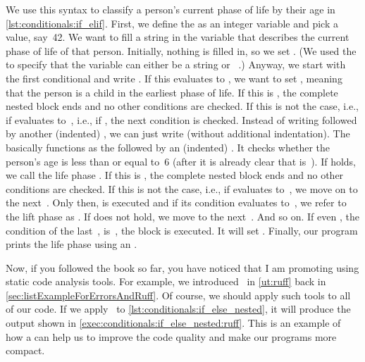 We use this syntax to classify a person's current phase of life by their age in \cref{lst:conditionals:if_elif}.
First, we define the  as an integer variable and pick a value, say~42.
We want to fill a string in the variable  that describes the current phase of life of that person.
Initially, nothing is filled in, so we set .
(We used the   to specify that the variable can either be a string or ~\cite{PEP604}.)
Anyway, we start with the first conditional and write .
If this evaluates to , we want to set , meaning that the person is a child in the earliest phase of life.
If this is , the complete nested  block ends and no other conditions are checked.
If this is not the case, i.e., if  evaluates to~, i.e., if , the next condition is checked.
Instead of writing  followed by another (indented) , we can just write  (without additional indentation).
The  basically functions as the  followed by an (indented) .
It checks whether the person's age is less than or equal to~6 (after it is already clear that  is~).
If  holds, we call the life phase .
If this is , the complete nested  block ends and no other conditions are checked.
If this is not the case, i.e., if  evaluates to~, we move on to the next~.
Only then,  is executed and if its condition evaluates to~, we refer to the lift phase as .
If  does not hold, we move to the next~.
And so on.
If even , the condition of the last~, is~, the  block is executed.
It will set .
Finally, our program prints the life phase using an .

Now, if you followed the book so far, you have noticed that I am promoting using static code analysis tools.
For example, we introduced \ruff\ in \cref{ut:ruff} back in \cref{sec:listExampleForErrorsAndRuff}.
Of course, we should apply such tools to all of our code.
If we apply \ruff\ to \cref{lst:conditionals:if_else_nested}, it will produce the output shown in \cref{exec:conditionals:if_else_nested:ruff}.
This is an example of how a  can help us to improve the code quality and make our programs more compact.

